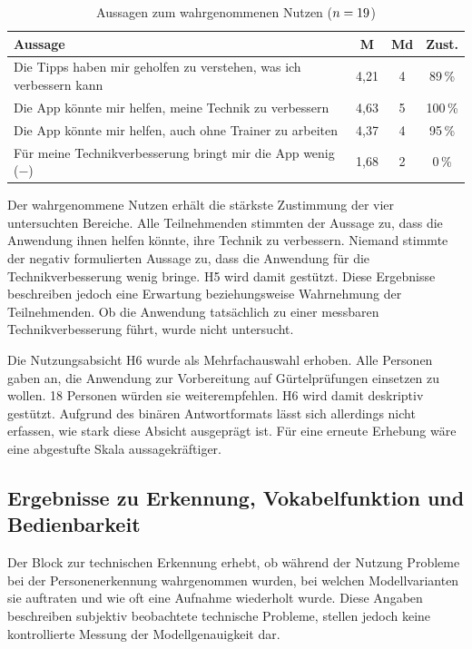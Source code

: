 \documentclass[intern]{cgMA}
\begin{document}
\begin{table}[htbp]
\centering
\small
\begin{tabular}{p{} c c c}
\hline
\textbf{Aussage} & \textbf{M} & \textbf{Md} & \textbf{Zust.} \\ \hline
Die Tipps haben mir geholfen zu verstehen, was ich verbessern kann & 4,21 & 4 & 89\,\% \\
Die App könnte mir helfen, meine Technik zu verbessern & 4,63 & 5 & 100\,\% \\
Die App könnte mir helfen, auch ohne Trainer zu arbeiten & 4,37 & 4 & 95\,\% \\
Für meine Technikverbesserung bringt mir die App wenig ($-$) & 1,68 & 2 & 0\,\% \\ \hline
\end{tabular}
\caption{Aussagen zum wahrgenommenen Nutzen ($n=19$)}
\label{tab:eval_nutzen}
\end{table}

Der wahrgenommene Nutzen erhält die stärkste Zustimmung der vier untersuchten Bereiche. Alle Teilnehmenden stimmten der Aussage zu, dass die Anwendung ihnen helfen könnte, ihre Technik zu verbessern. Niemand stimmte der negativ formulierten Aussage zu, dass die Anwendung für die Technikverbesserung wenig bringe. H5 wird damit gestützt. Diese Ergebnisse beschreiben jedoch eine Erwartung beziehungsweise Wahrnehmung der Teilnehmenden. Ob die Anwendung tatsächlich zu einer messbaren Technikverbesserung führt, wurde nicht untersucht.

Die Nutzungsabsicht H6 wurde als Mehrfachauswahl erhoben. Alle \Nteiln{} Personen gaben an, die Anwendung zur Vorbereitung auf Gürtelprüfungen einsetzen zu wollen. 18 Personen würden sie weiterempfehlen. H6 wird damit deskriptiv gestützt. Aufgrund des binären Antwortformats lässt sich allerdings nicht erfassen, wie stark diese Absicht ausgeprägt ist. Für eine erneute Erhebung wäre eine abgestufte Skala aussagekräftiger.

\subsection{Ergebnisse zu Erkennung, Vokabelfunktion und Bedienbarkeit}
\label{sec:eval_weitere}
Der Block zur technischen Erkennung erhebt, ob während der Nutzung Probleme bei der Personenerkennung wahrgenommen wurden, bei welchen Modellvarianten sie auftraten und wie oft eine Aufnahme wiederholt wurde. Diese Angaben beschreiben subjektiv beobachtete technische Probleme, stellen jedoch keine kontrollierte Messung der Modellgenauigkeit dar.
\end{document}
